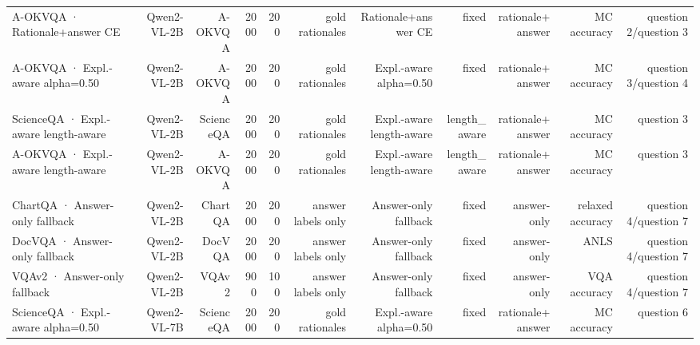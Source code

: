 \begin{table}
\begin{tabular}{lrrrrrrrrrr}
A-OKVQA · Rationale+answer CE & Qwen2-VL-2B & A-OKVQA & 2000 & 200 & gold rationales & Rationale+answer CE & fixed & rationale+answer & MC accuracy & question 2/question 3 \\
A-OKVQA · Expl.-aware alpha=0.50 & Qwen2-VL-2B & A-OKVQA & 2000 & 200 & gold rationales & Expl.-aware alpha=0.50 & fixed & rationale+answer & MC accuracy & question 3/question 4 \\
ScienceQA · Expl.-aware length-aware & Qwen2-VL-2B & ScienceQA & 2000 & 200 & gold rationales & Expl.-aware length-aware & length_aware & rationale+answer & MC accuracy & question 3 \\
A-OKVQA · Expl.-aware length-aware & Qwen2-VL-2B & A-OKVQA & 2000 & 200 & gold rationales & Expl.-aware length-aware & length_aware & rationale+answer & MC accuracy & question 3 \\
ChartQA · Answer-only fallback & Qwen2-VL-2B & ChartQA & 2000 & 200 & answer labels only & Answer-only fallback & fixed & answer-only & relaxed accuracy & question 4/question 7 \\
DocVQA · Answer-only fallback & Qwen2-VL-2B & DocVQA & 2000 & 200 & answer labels only & Answer-only fallback & fixed & answer-only & ANLS & question 4/question 7 \\
VQAv2 · Answer-only fallback & Qwen2-VL-2B & VQAv2 & 900 & 100 & answer labels only & Answer-only fallback & fixed & answer-only & VQA accuracy & question 4/question 7 \\
ScienceQA · Expl.-aware alpha=0.50 & Qwen2-VL-7B & ScienceQA & 2000 & 200 & gold rationales & Expl.-aware alpha=0.50 & fixed & rationale+answer & MC accuracy & question 6 \\
\bottomrule
\end{tabular}
\end{table}
